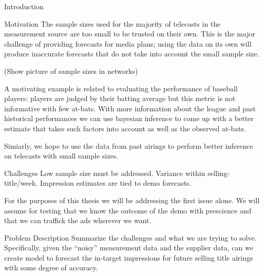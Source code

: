 \begin{chapter}{Introduction}
\begin{section}{Motivation}
  The sample sizes used for the majority of telecasts in the measurement source
  are too small to be trusted on their own. This is the major challenge of providing
  forecasts for media plans; using the data on its own will produce inaccurate
  forecasts that do not take into account the small sample size.

  (Show picture of sample sizes in networks)

  A motivating example is related to evaluating the performance of baseball players: players are judged by their
  batting average but this metric is not informative with few at-bats. With more
  information about the league and past historical performances we can use bayesian
  inference to come up with a better estimate that takes such factors into account
  as well as the observed at-bats.

  Simiarly, we hope to use the data from past airings to perform better inference
  on telecasts with small sample sizes.
\end{section}

\begin{section}{Challenges}
  Low sample size must be addressed.
  Variance within selling-title/week.
  Impression estimates are tied to demo forecasts.

  For the purposes of this thesis we will be addressing the first issue alone.
  We will assume for testing that we know the outcome of the demo with prescience and
  that we can traffick the ads wherever we want.
\end{section}

\begin{section}{Problem Description}
  Summarize the challenges and what we are trying to solve. Specifically,
  given the ``noisy'' measurement data and the supplier data, can we create model
  to forecast the in-target impressions for future selling title airings with some degree of accuracy.
\end{section}
\end{chapter}